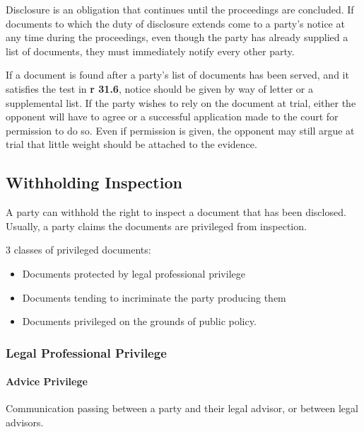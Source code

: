 \documentclass[
]{article}
\providecommand{\tightlist}{%
  \setlength{\itemsep}{0pt}\setlength{\parskip}{0pt}}
\begin{document}
Disclosure is an obligation that continues until the proceedings are
concluded. If documents to which the duty of disclosure extends come to
a party's notice at any time during the proceedings, even though the
party has already supplied a list of documents, they must immediately
notify every other party.

If a document is found after a party's list of documents has been
served, and it satisfies the test in \textbf{r 31.6}, notice should be
given by way of letter or a supplemental list. If the party wishes to
rely on the document at trial, either the opponent will have to agree or
a successful application made to the court for permission to do so. Even
if permission is given, the opponent may still argue at trial that
little weight should be attached to the evidence.

\hypertarget{withholding-inspection}{%
\subsection{Withholding Inspection}\label{withholding-inspection}}

A party can withhold the right to inspect a document that has been
disclosed. Usually, a party claims the documents are privileged from
inspection.

3 classes of privileged documents:

\begin{itemize}
\tightlist
\item
  Documents protected by legal professional privilege
\item
  Documents tending to incriminate the party producing them
\item
  Documents privileged on the grounds of public policy.
\end{itemize}

\hypertarget{legal-professional-privilege}{%
\subsubsection{Legal Professional
Privilege}\label{legal-professional-privilege}}

\hypertarget{advice-privilege}{%
\paragraph{Advice Privilege}\label{advice-privilege}}

Communication passing between a party and their legal advisor, or
between legal advisors.
\end{document}
